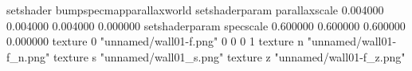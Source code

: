 setshader bumpspecmapparallaxworld
setshaderparam parallaxscale 0.004000 0.004000 0.004000 0.000000
setshaderparam specscale 0.600000 0.600000 0.600000 0.000000
texture 0 "unnamed/wall01-f.png" 0 0 0 1
texture n "unnamed/wall01-f_n.png"
texture s "unnamed/wall01_s.png"
texture z "unnamed/wall01-f_z.png"